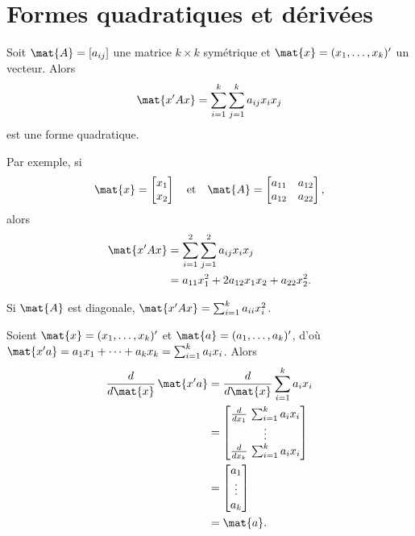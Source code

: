 \section{Formes quadratiques et dérivées}

Soit $\mat{A} = [a_{ij}]$ une matrice $k \times k$ symétrique et
$\mat{x} = (x_1, \dots, x_k)^\prime$ un vecteur. Alors
\begin{displaymath}
  \mat{x^\prime A x} = \sum_{i=1}^k \sum_{j=1}^k a_{ij} x_i x_j
\end{displaymath}
est une forme quadratique.

Par exemple, si
\begin{displaymath}
  \mat{x} =
  \begin{bmatrix}
    x_1 \\
    x_2
  \end{bmatrix}
  \quad
  \text{et}
  \quad
  \mat{A} =
  \begin{bmatrix}
    a_{11} & a_{12} \\
    a_{12} & a_{22}
  \end{bmatrix},
\end{displaymath}
alors
\begin{align*}
  \mat{x^\prime Ax}
  &= \sum_{i=1}^2 \sum_{j=1}^2 a_{ij} x_i x_j \\
  &= a_{11} x_1^2 + 2 a_{12} x_1 x_2 + a_{22} x_2^2.
\end{align*}

\begin{rem}
  Si $\mat{A}$ est diagonale, $\mat{x^\prime Ax} = \sum_{i=1}^k a_{ii} x_i^2$.
\end{rem}

\begin{thm}
  \label{thm:elements:derivee_produit_scalaire}
  Soient $\mat{x} = (x_1, \dots, x_k)^\prime$ et $\mat{a} = (a_1,
  \dots, a_k)^\prime$, d'où $\mat{x^\prime a} = a_1 x_1 + \dots + a_k x_k =
  \sum_{i=1}^k a_i x_i$. Alors
  \begin{align*}
    \frac{d}{d \mat{x}}\, \mat{x^\prime a}
    &= \frac{d}{d \mat{x}} \sum_{i=1}^k a_i x_i \\
    &=
    \begin{bmatrix}
      \frac{d}{d x_1}\, \sum_{i=1}^k a_i x_i \\
      \vdots \\
      \frac{d}{d x_k}\, \sum_{i=1}^k a_i x_i
    \end{bmatrix} \\
    &=
    \begin{bmatrix}
      a_1 \\
      \vdots \\
      a_k
    \end{bmatrix} \\
    &= \mat{a}.
  \end{align*}
\end{thm}

